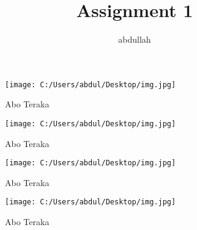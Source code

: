 \documentclass{article}
\title{Assignment 1}
\author{abdullah}
\begin{document}
	\maketitle
	\newpage
	\begin{figure}[h!]
		\texttt{[image: C:/Users/abdul/Desktop/img.jpg]}
		\caption{Abo Teraka}
	\end{figure}
	\begin{figure}[H]
		\texttt{[image: C:/Users/abdul/Desktop/img.jpg]}
		\caption{Abo Teraka}
	\end{figure}
	\begin{figure}[b!]
		\texttt{[image: C:/Users/abdul/Desktop/img.jpg]}
		\caption{Abo Teraka}
	\end{figure}
	\begin{figure}[t!]
		\texttt{[image: C:/Users/abdul/Desktop/img.jpg]}
		\caption{Abo Teraka}
	\end{figure}
\end{document}
